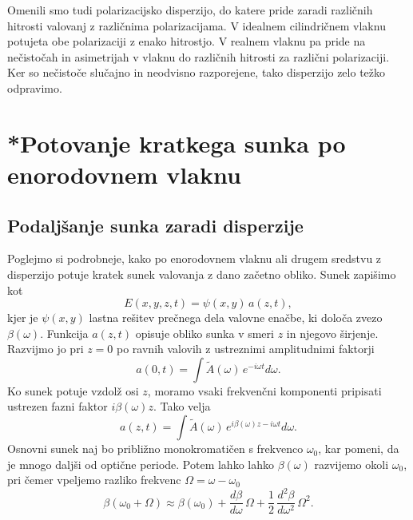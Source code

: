 \begin{remark}
 Omenili smo tudi polarizacijsko disperzijo, 
 do katere pride zaradi različnih hitrosti valovanj
 z različnima polarizacijama. V idealnem cilindričnem vlaknu potujeta obe polarizaciji
 z enako hitrostjo. V realnem vlaknu pa 
 pride na nečistočah in asimetrijah v vlaknu do različnih hitrosti za različni polarizaciji. 
 Ker so nečistoče slučajno in neodvisno razporejene, tako disperzijo zelo težko odpravimo.
\end{remark}

\section{*Potovanje kratkega sunka po enorodovnem vlaknu}
\label{chap:sunvl}
\subsection*{Podaljšanje sunka zaradi disperzije}
Poglejmo si podrobneje, kako po enorodovnem vlaknu ali drugem
sredstvu z disperzijo potuje kratek sunek valovanja z dano začetno obliko.
Sunek zapišimo kot  
\begin{equation}
E\left(x, y, z, t\right)=\psi\left(x,y\right)\, a\left(z,t\right),
\label{9.61}
\end{equation}
kjer je $\psi\left(x,y\right)$ lastna rešitev prečnega dela valovne
enačbe, ki določa  zvezo $\beta\left(\omega\right)$. 
Funkcija $a\left(z,t\right)$ opisuje obliko sunka v smeri $z$ in njegovo
širjenje. Razvijmo jo pri $z=0$ po ravnih valovih z ustreznimi amplitudnimi faktorji 
\begin{equation}
a\left(0,t\right)=\int \tilde{A}(\omega)\, e^{- i\omega t}d\omega.
\label{9.62}
\end{equation}
Ko sunek potuje vzdolž osi $z$, moramo vsaki frekvenčni komponenti pripisati
ustrezen fazni faktor $i \beta (\omega) z$. Tako velja
\begin{equation}
a\left(z,t\right)=\int \tilde{A}(\omega)\, e^{i \beta (\omega) z - i\omega t}d\omega.
\label{9.62f}
\end{equation}
Osnovni sunek naj bo približno monokromatičen s frekvenco $\omega_{0}$,
kar pomeni, da je mnogo daljši od optične periode. Potem lahko lahko $\beta(\omega)$
razvijemo okoli $\omega_{0}$, pri čemer vpeljemo razliko frekvenc $\Omega = \omega - \omega_0$
\begin{equation}
\beta(\omega_0 + \Omega) \approx \beta(\omega_{0})
+\frac{d\beta}{d\omega}\,\Omega+\frac{1}{2}\,\frac{d^{2}\beta}{d\omega^{2}}\,\Omega^{2}.
\label{9.62c}
\end{equation}
